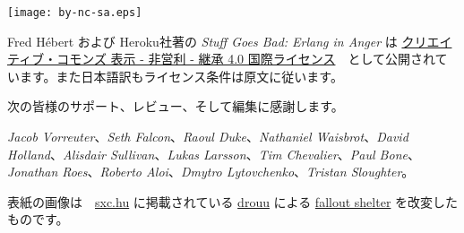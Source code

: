 \clearpage
\thispagestyle{fancy}

\fancyhf{} %
\renewcommand{\headrulewidth}{0pt} %
\renewcommand{\footrulewidth}{0pt}

\vspace*{\fill}


\begin{center}
\texttt{[image: by-nc-sa.eps]}
\end{center}

\begin{center}
Fred Hébert および Heroku社著の \emph{Stuff Goes Bad: Erlang in Anger} は \href{http://creativecommons.org/licenses/by-nc-sa/4.0/}{クリエイティブ・コモンズ 表示 - 非営利 - 継承 4.0 国際ライセンス}　として公開されています。また日本語訳もライセンス条件は原文に従います。
\end{center}


次の皆様のサポート、レビュー、そして編集に感謝します。

\emph{Jacob Vorreuter}、\emph{Seth Falcon}、\emph{Raoul Duke}、\emph{Nathaniel Waisbrot}、\emph{David Holland}、\emph{Alisdair Sullivan}、\emph{Lukas Larsson}、\emph{Tim Chevalier}、\emph{Paul Bone}、\emph{Jonathan Roes}、\emph{Roberto Aloi}、\emph{Dmytro Lytovchenko}、\emph{Tristan Sloughter}。

\null
\vfill
表紙の画像は　\href{http://sxc.hu}{sxc.hu} に掲載されている \href{http://www.freeimages.com/profile/drouu}{drouu} による \href{http://www.freeimages.com/photo/533163}{fallout shelter} を改変したものです。



